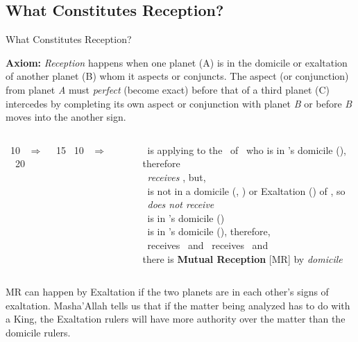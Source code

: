 \subsection{What Constitutes Reception?}
\begin{frame}[t]{What Constitutes Reception?}
\small
\begin{block}{}
\textbf{Axiom:} {
\textsl{Reception} happens when one planet (A) is in the domicile or exaltation of another planet (B) whom it aspects or conjuncts.
The aspect (or conjunction) from planet \textsl{A} must \textsl{perfect} (become exact)  before that of a third planet (C) intercedes by completing its own aspect or conjunction with planet \textsl{B} or before \textsl{B} moves into the another sign.}
\end{block}

\vspace{0.1cm}
\begin{columns}[T, onlytextwidth]
\Mars\ 10 \Aries\ $\Rightarrow$ \Conjunction\ \Saturn\ 15 \Aries
\vspace{1.5cm}
\Mars\ 10 \Capricorn\ $\Rightarrow$ \Square\ \Saturn\ 20 \Aries

\rule{.1mm}{.4\textheight}

\Mars\ is applying to the \Conjunction\ of \Saturn\ who is in \Mars's domicile (\Aries), therefore\\
\Mars\ \textsl{receives} \Saturn, but, \\
\Mars\ is not in a domicile (\Capricorn, \Aquarius) or Exaltation (\Libra) of \Saturn, so \\
\Saturn\ \textsl{does not receive} \Mars \\
\vspace{0.1cm}
\ul
\Mars\ is in \Saturn's domicile (\Capricorn) \\
\Saturn\ is in \Mars's domicile (\Aries), therefore, \\
\Mars\ receives \Saturn\ and \Saturn\ receives \Mars\ and \\
there is \textbf{Mutual Reception} [MR] by \textsl{domicile}
\end{columns}
\vspace{0.2cm}
 MR can happen by Exaltation if the two planets are in each other's signs of exaltation. Masha'Allah tells us that if the matter being analyzed has to do with a King, the Exaltation rulers will have more authority over the matter than the domicile rulers.
\end{frame}